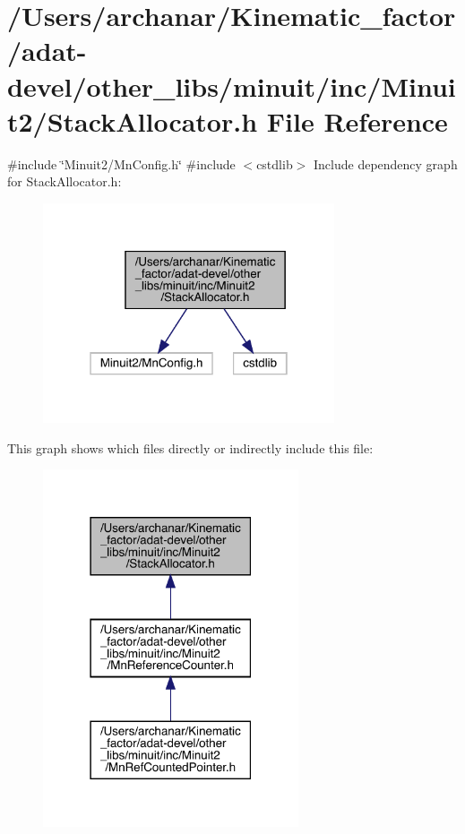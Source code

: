 \hypertarget{adat-devel_2other__libs_2minuit_2inc_2Minuit2_2StackAllocator_8h}{}\section{/\+Users/archanar/\+Kinematic\+\_\+factor/adat-\/devel/other\+\_\+libs/minuit/inc/\+Minuit2/\+Stack\+Allocator.h File Reference}
\label{adat-devel_2other__libs_2minuit_2inc_2Minuit2_2StackAllocator_8h}
{\ttfamily \#include \char`\"{}Minuit2/\+Mn\+Config.\+h\char`\"{}}\newline
{\ttfamily \#include $<$cstdlib$>$}\newline
Include dependency graph for Stack\+Allocator.\+h\+:
\nopagebreak
\begin{figure}[H]
\begin{center}
\leavevmode
\includegraphics[width=244pt]{d3/d20/adat-devel_2other__libs_2minuit_2inc_2Minuit2_2StackAllocator_8h__incl}
\end{center}
\end{figure}
This graph shows which files directly or indirectly include this file\+:
\nopagebreak
\begin{figure}[H]
\begin{center}
\leavevmode
\includegraphics[width=214pt]{d6/d87/adat-devel_2other__libs_2minuit_2inc_2Minuit2_2StackAllocator_8h__dep__incl}
\end{center}
\end{figure}
